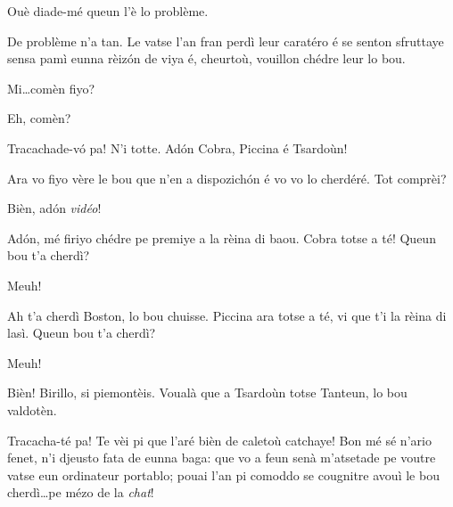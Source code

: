 \begin{drama}

\Cienspeaks {} Ouè diade-mé queun l’è lo problème.

\Schulzspeaks De problème n’a tan. Le vatse l’an fran perdì leur caratéro é se senton sfruttaye sensa pamì eunna rèiz\'on de viya é, cheurtoù, vouillon chédre leur lo bou.

\Cienspeaks Mi\ldots comèn fiyo?

\Mariettospeaks{} Eh, comèn?

\Schulzspeaks Tracachade-v\'o pa! N’i totte. Ad\'on   Cobra, Piccina é Tsardoùn!


\Schulzspeaks Ara vo fiyo vère le bou que n’en a dispozich\'on é vo vo lo cherdéré. Tot comprèi?


\Schulzspeaks Bièn, ad\'on \textit{vidéo}!



\Schulzspeaks Ad\'on, mé firiyo chédre pe premiye a la rèina di baou. Cobra totse a té! Queun bou t'a cherdì?

\Cobraspeaks{} Meuh!

\Schulzspeaks Ah t’a cherdì Boston, lo bou chuisse. Piccina ara totse a té, vi que t’i la rèina di lasì. Queun bou t'a cherdì?

\Piccinaspeaks{} Meuh!

\Schulzspeaks Bièn! Birillo, si piemontèis. Voualà que a Tsardoùn totse Tanteun, lo bou valdotèn.


\Schulzspeaks{} Tracacha-té pa! Te vèi pi que l'aré bièn de caletoù catchaye!  Bon mé sé n'ario fenet, n'i djeusto fata de eunna baga: que vo a feun senà m'a\-tse\-tade pe voutre vatse eun ordinateur portablo; pouai l'an pi comoddo se cougnitre avouì le bou cherdì\ldots pe mézo de la \textit{chat}!


\end{drama}
